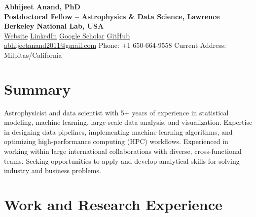 \documentclass[a4paper,10pt]{article}
\begin{document}
\begin{center}
    {\huge \textbf{Abhijeet Anand, PhD}} \\
    {\normalsize \vspace{1.5mm}
    \textbf{Postdoctoral Fellow – Astrophysics \& Data Science, Lawrence Berkeley National Lab, USA}} \\
    \vspace{1mm}
    \href{https://abhi0395.github.io}{Website} \quad
    \href{https://www.linkedin.com/in/abhijeet-anand-iisc}{LinkedIn} \quad
    \href{https://scholar.google.com/citations?hl=en&user=MfOuq1IAAAAJ}{Google Scholar} \quad
    \href{https://github.com/abhi0395}{GitHub}\\
    \vspace{1mm}
\href{mailto:abhijeetanand2011@gmail.com}{abhijeetanand2011@gmail.com} \quad Phone: +1 650-664-9558
     \quad 
    Current Address: Milpitas/California \quad 
\end{center}
\vspace*{-5mm}
\section*{Summary}
Astrophysicist and data scientist with 5+ years of experience in statistical modeling, machine learning, large-scale data analysis, and visualization. Expertise in designing data pipelines, implementing machine learning algorithms, and optimizing high-performance computing (HPC) workflows. Experienced in working within large international collaborations with diverse, cross-functional teams. Seeking opportunities to apply and develop analytical skills for solving industry and business problems.
\vspace*{-3mm}
\section*{Work and Research Experience}
\end{document}
